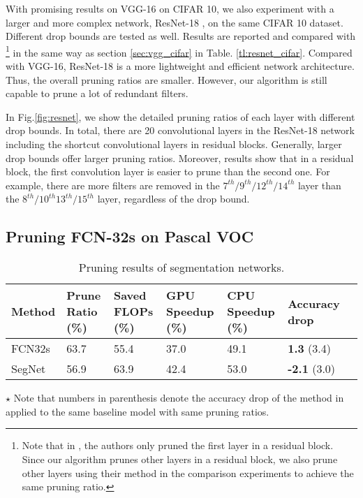 \documentclass[10pt,twocolumn,letterpaper]{article}
\begin{document}
With promising results on VGG-16 on CIFAR 10, we also experiment with a larger and more complex network, ResNet-18 \cite{resnet}, on the same CIFAR 10 dataset. Different drop bounds are tested as well. Results are reported and compared with \cite{iclr17} \footnote{Note that in \cite{iclr17}, the authors only pruned the first layer in a residual block. Since our algorithm prunes other layers in a residual block, we also prune other layers using their method in the comparison experiments to achieve the same pruning ratio.} in the same way as section \ref{sec:vgg_cifar} in Table. \ref{tl:resnet_cifar}. Compared with VGG-16, ResNet-18 is a more lightweight and efficient network architecture. Thus, the overall pruning ratios are smaller. However, our algorithm is still capable to prune a lot of redundant filters.

In Fig.\ref{fig:resnet}, we show the detailed pruning ratios of each layer with different drop bounds. In total, there are 20 convolutional layers in the ResNet-18 network including the shortcut convolutional layers in residual blocks. Generally, larger drop bounds offer larger pruning ratios. Moreover, results show that in a residual block, the first convolution layer is easier to prune than the second one. For example, there are more filters are removed in the $7^{th}/9^{th}/12^{th}/14^{th}$ layer than the $8^{th}/10^{th}13^{th}/15^{th}$ layer, regardless of the drop bound.


\subsection{Pruning FCN-32s on Pascal VOC}




\begin{table*}[t]
  \caption{Pruning results of segmentation networks.}
  \label{tl:fcn}
  \centering
  \begin{tabular}{lllllll}
    \toprule

    Method     & Prune Ratio (\%)  & Saved FLOPs (\%)   & GPU Speedup (\%) & CPU Speedup (\%) & Accuracy drop \\
    \midrule
    
    FCN32s 	   &  63.7	& 55.4 & 37.0	&49.1    &  \textbf{1.3} (3.4)	\\
    
    SegNet 	   &  56.9	 & 63.9 & 42.4	&53.0 &  \textbf{-2.1} (3.0)	\\
    
    \bottomrule
  \end{tabular}
  
    \begin{tablenotes}
      \small
      \item $\star$ Note that numbers in parenthesis denote the accuracy drop of the method in \cite{iclr17} applied to the same baseline model with same pruning ratios.
    \end{tablenotes}
    
  
\end{table*}
\end{document}
